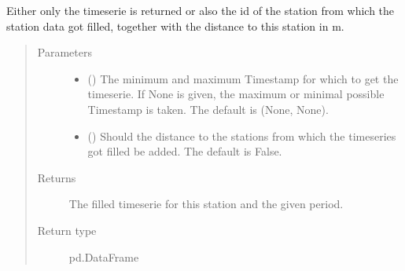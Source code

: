 \documentclass[letterpaper,10pt,english]{sphinxmanual}
\begin{document}
\begin{fulllineitems}
\begin{fulllineitems}
\sphinxAtStartPar
Either only the timeserie is returned or also the id of the station from which the station data got filled, together with the distance to this station in m.
\begin{quote}\begin{description}
\item[{Parameters}] \leavevmode\begin{itemize}
\item {} 
\sphinxAtStartPar
{} ({\hyperref[\detokenize{weatherDB.lib:weatherDB.lib.utils.TimestampPeriod}]{}}\sphinxstyleliteralemphasis{\sphinxupquote{(}}\sphinxstyleliteralemphasis{\sphinxupquote{)}}\sphinxstyleliteralemphasis{\sphinxupquote{, }}) \textendash{} The minimum and maximum Timestamp for which to get the timeserie.
If None is given, the maximum or minimal possible Timestamp is taken.
The default is (None, None).

\item {} 
\sphinxAtStartPar
{} (\sphinxstyleliteralemphasis{\sphinxupquote{, }}) \textendash{} Should the distance to the stations from which the timeseries got filled be added.
The default is False.

\end{itemize}

\item[{Returns}] \leavevmode
\sphinxAtStartPar
The filled timeserie for this station and the given period.

\item[{Return type}] \leavevmode
\sphinxAtStartPar
pd.DataFrame

\end{description}\end{quote}

\end{fulllineitems}



\end{fulllineitems}
\end{document}
